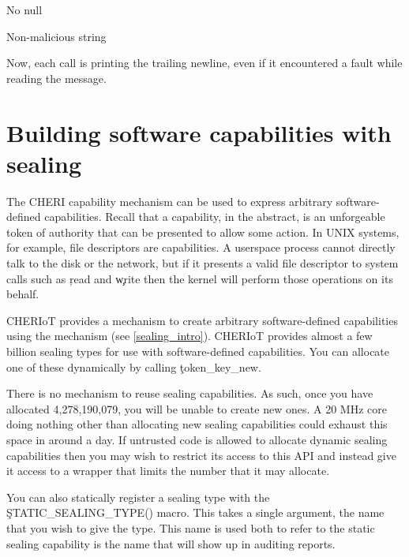 \begin{console}
No null


Non-malicious string
\end{console}

Now, each call is printing the trailing newline, even if it encountered a fault while reading the message.

\section[label=software_capabilities]{Building software capabilities with sealing}

The CHERI capability mechanism can be used to express arbitrary software-defined capabilities.
Recall that a capability, in the abstract, is an unforgeable token of authority that can be presented to allow some action.
In UNIX systems, for example, file descriptors are capabilities.
A userspace process cannot directly talk to the disk or the network, but if it presents a valid file descriptor to system calls such as \c{read} and \c{write} then the kernel will perform those operations on its behalf.

CHERIoT provides a mechanism to create arbitrary software-defined capabilities using the  mechanism (see \ref{sealing_intro}).
CHERIoT provides almost a few billion sealing types for use with software-defined capabilities.
You can allocate one of these dynamically by calling \c{token_key_new}.

\begin{caution}
There is no mechanism to reuse sealing capabilities.
As such, once you have allocated 4,278,190,079, you will be unable to create new ones.
A 20 MHz core doing nothing other than allocating new sealing capabilities could exhaust this space in around a day.
If untrusted code is allowed to allocate dynamic sealing capabilities then you may wish to restrict its access to this API and instead give it access to a wrapper that limits the number that it may allocate.
\end{caution}


You can also statically register a sealing type with the \c{STATIC_SEALING_TYPE()} macro.
This takes a single argument, the name that you wish to give the type.
This name is used both to refer to the static sealing capability is the name that will show up in auditing reports.


